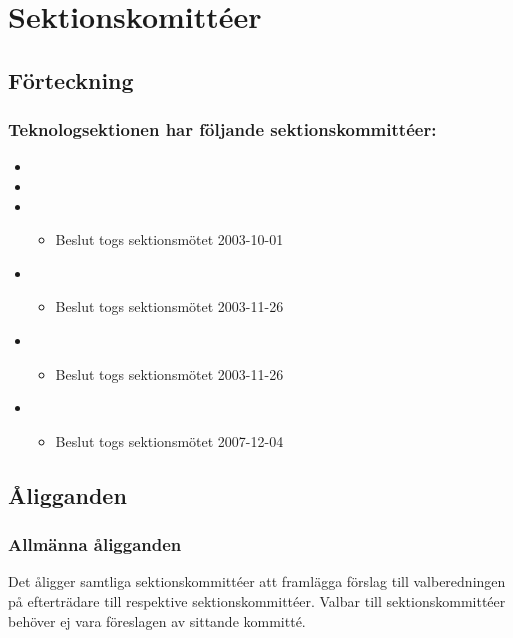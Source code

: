 \section{Sektionskomittéer}

\subsection{Förteckning}

\subsubsection{Teknologsektionen har följande sektionskommittéer:}

\begin{itemize}
	\item \SEXITFULL
	\item \NOLLKITFULL
	\item \PRITFULL
	\begin{itemize}
		\item Beslut togs sektionsmötet 2003-10-01
	\end{itemize}
	\item \FRITIDFULL
	\begin{itemize}
		\item Beslut togs sektionsmötet 2003-11-26
	\end{itemize}
	\item \ARMITFULL
	\begin{itemize}
		\item Beslut togs sektionsmötet 2003-11-26
	\end{itemize}
	\item \DIGITFULL
	\begin{itemize}
		\item Beslut togs sektionsmötet 2007-12-04 
	\end{itemize}

\end{itemize}

\subsection{Åligganden}
\subsubsection{Allmänna åligganden}
Det åligger samtliga sektionskommittéer att framlägga förslag till valberedningen på efterträdare till respektive sektionskommittéer. Valbar till sektionskommittéer behöver ej vara föreslagen av sittande kommitté.

\newpage

\newpage

\newpage

\newpage

\newpage

\newpage

\newpage
